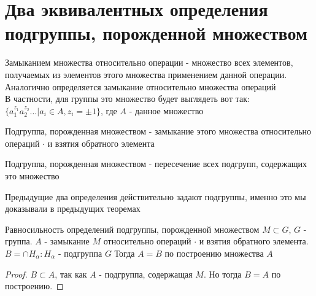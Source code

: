 \section{Два эквивалентных определения подгруппы, порожденной множеством}
\begin{Def}
	Замыканием множества относительно операции - множество всех элементов, получаемых из элементов этого множества применением данной операции. \\
	Аналогично определяется замыкание относительно множества операций \\
	В частности, для группы это множество будет выглядеть вот так: $\{a_1^{z_1}a_2^{z_2}\dots | a_i \in A, z_i = \pm 1 \}$, где $A$ - данное множество
\end{Def}

\begin{Def}
	Подгруппа, порожденная множеством - замыкание этого множества относительно операций $\cdot$ и взятия обратного элемента \\
\end{Def}

\begin{Def}
	Подгруппа, порожденная множеством - пересечение всех подгрупп, содержащих это множество \\
\end{Def}

\begin{Rem}
	Предыдущие два определения действительно задают подгруппы, именно это мы доказывали в предыдущих теоремах  \\
\end{Rem}

\begin{theorem} {Равносильность определений подгруппы, порожденной множеством}
	$M \subset G$, $G$ - группа.
	$A$ - замыкание $M$ относительно операций $\cdot$ и взятия обратного элемента.
	$B = \cap H_\alpha : H_\alpha$ - подгруппа $G$
	Тогда $A = B$ по построению множества $A$
\end{theorem}
\begin{proof}
	$B \subset A$, так как $A$ - подгруппа, содержащая $M$.
	Но тогда $B = A$ по построению.	
\end{proof}
